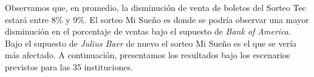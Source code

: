Observamos que, en promedio, la disminución de venta de boletos del Sorteo Tec estará entre 8\% y 9\%. El sorteo Mi Sueño es donde se podría observar una mayor disminución en el porcentaje de ventas bajo el supuesto de \textit{Bank of America}. Bajo el supuesto de \textit{Julius Baer} de nuevo el sorteo Mi Sueño es el que se vería más afectado. A continuación, presentamos los resultados bajo los escenarios previstos para las 35 instituciones.

\begin{table}[H]
\centering
\caption{Resultados para diferentes escenarios}
\label{}
\end{table}
